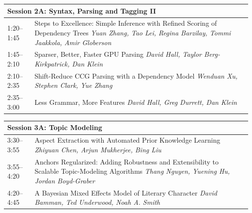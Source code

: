 \documentclass{book}
\renewcommand{\large}{\fontsize{36}{40}\selectfont}
\begin{document}
\begin{tabular}{p{3in}p{16in}}
  \multicolumn{2}{l}{\bfseries\large Session 2A: Syntax, Parsing and Tagging II} \\\hline

    
    1:20--1:45
    &	Steps to Excellence: Simple Inference with Refined Scoring of Dependency Trees \newline 
    {\itshape Yuan Zhang, Tao Lei, Regina Barzilay, Tommi Jaakkola, Amir Globerson} \\
    
    1:45--2:10
    &	Sparser, Better, Faster GPU Parsing \newline 
    {\itshape David Hall, Taylor Berg-Kirkpatrick, Dan Klein} \\
    
    2:10--2:35
    &	Shift-Reduce CCG Parsing with a Dependency Model \newline 
    {\itshape Wenduan Xu, Stephen Clark, Yue Zhang} \\
    
    2:35--3:00
    &	Less Grammar, More Features \newline 
    {\itshape David Hall, Greg Durrett, Dan Klein} \\
    
\end{tabular}

\begin{tabular}{p{3in}p{16in}}
  \multicolumn{2}{l}{\bfseries\large Session 3A: Topic Modeling} \\\hline

    
    3:30--3:55
    &	Aspect Extraction with Automated Prior Knowledge Learning \newline 
    {\itshape Zhiyuan Chen, Arjun Mukherjee, Bing Liu} \\
    
    3:55--4:20
    &	Anchors Regularized: Adding Robustness and Extensibility to Scalable Topic-Modeling Algorithms \newline 
    {\itshape Thang Nguyen, Yuening Hu, Jordan Boyd-Graber} \\
    
    4:20--4:45
    &	A Bayesian Mixed Effects Model of Literary Character \newline 
    {\itshape David Bamman, Ted Underwood, Noah A. Smith} \\
    
\end{tabular}
\end{document}
